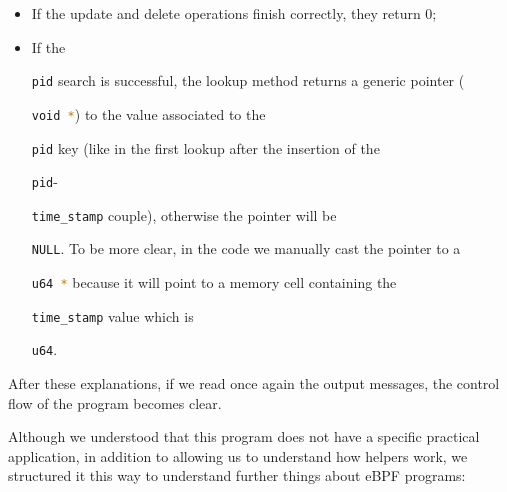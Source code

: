 \begin{itemize}
	\item 
		If the update and delete operations finish correctly, they return 0;
	\item 
		If the \raggedright\colorbox{backcolour}{\lstinline[style=commandline, language=bash]|pid|} search is successful, the lookup method returns a generic pointer (\raggedright\colorbox{backcolour}{\lstinline[style=commandline, language=bash]|void *|}) to the value associated to the \raggedright\colorbox{backcolour}{\lstinline[style=commandline, language=bash]|pid|} key (like in the first lookup after the insertion of the \raggedright\colorbox{backcolour}{\lstinline[style=commandline, language=bash]|pid|}-\raggedright\colorbox{backcolour}{\lstinline[style=commandline, language=bash]|time_stamp|} couple), otherwise the pointer will be \raggedright\colorbox{backcolour}{\lstinline[style=commandline, language=bash]|NULL|}.
		To be more clear, in the code we manually cast the pointer to a \raggedright\colorbox{backcolour}{\lstinline[style=commandline, language=bash]|u64 *|} because it will point to a memory cell containing the \raggedright\colorbox{backcolour}{\lstinline[style=commandline, language=bash]|time_stamp|} value which is \raggedright\colorbox{backcolour}{\lstinline[style=commandline, language=bash]|u64|}.
\end{itemize}

After these explanations, if we read once again the output messages, the control flow of the program becomes clear.

Although we understood that this program does not have a specific practical application, in addition to allowing us to understand how helpers work, we structured it this way to understand further things about eBPF programs:


